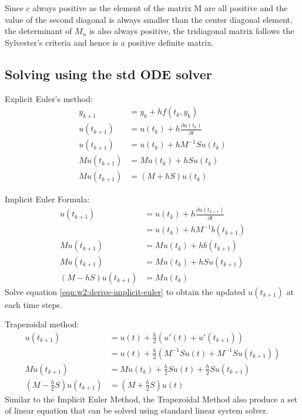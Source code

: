 \documentclass{article}
\begin{document}
Since $c$ always positive as the element of the matrix M are all positive and the value of the second diagonal is always smaller than the center diagonal element, the determinant of $M_n$ is also always positive, the tridiagonal matrix follows the Sylvester's criteria and hence is a positive definite matrix.



\subsection{Solving using the std ODE solver}%
\label{sub:Solving using the std ODE solver}
Explicit Euler's method:
\begin{align}
  y_{k+1} &= y_k + hf(t_k, y_k) \\
  u(t_{k+1}) &= u(t_k) + h \frac{\partial u(t_k)}{\partial t} \\
  u(t_{k+1}) &= u(t_k) + h M^{-1} S u(t_k) \\
  M u(t_{k+1}) &= M u(t_k) + h S u(t_k) \\
  M u(t_{k+1}) &= (M + hS) u(t_k)
\end{align}

Implicit Euler Formula:
\begin{align}
  u(t_{k+1}) &= u(t_k) + h \frac{\partial u(t_{k+1})}{\partial t} \\
             &= u(t_k) + h M^{-1} b(t_{k+1}) \\
  M u(t_{k+1}) &= M u(t_k) + hb(t_{k+1}) \\
  M u(t_{k+1}) &= M u(t_k) + h S u(t_{k+1}) \\
  (M - h S) u(t_{k+1}) &= M u(t_k) \label{eqn:w2:derive-implicit-euler}
\end{align}
Solve equation \ref{eqn:w2:derive-implicit-euler} to obtain the updated $u(t_{k+1})$ at each time steps.

Trapezoidal method:
\begin{align}
  u(t_{k+1}) &= u(t) + \frac{h}{2} \left(u'(t) + u'(t_{k+1}) \right) \\
             &= u(t) + \frac{h}{2} \left( M^{-1} S u(t) + M^{-1} S u(t_{k+1}) \right) \\
  M u(t_{k+1}) &= M u(t_k) + \frac{h}{2} S u(t) + \frac{h}{2} S u(t_{k+1}) \\
  \left(M - \frac{h}{2}S \right) u(t_{k+1}) &= \left( M + \frac{h}{2}S \right) u(t) \label{eqn:w2:derived-trapezoidal-method}
\end{align}
Similar to the Implicit Euler Method, the Trapezoidal Method also produce a set of linear equation that can be solved using standard linear system solver.
\end{document}
